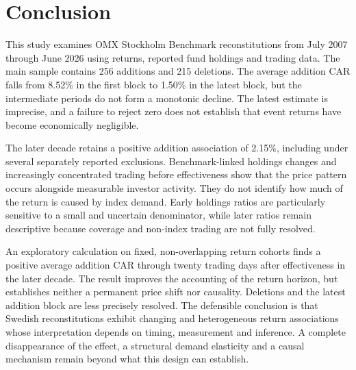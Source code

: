\section{Conclusion}

This study examines OMX Stockholm Benchmark reconstitutions from July 2007 through June 2026 using returns, reported fund holdings and trading data. The main sample contains 256 additions and 215 deletions. The average addition CAR falls from 8.52\% in the first block to 1.50\% in the latest block, but the intermediate periods do not form a monotonic decline. The latest estimate is imprecise, and a failure to reject zero does not establish that event returns have become economically negligible.

The later decade retains a positive addition association of 2.15\%, including under several separately reported exclusions. Benchmark-linked holdings changes and increasingly concentrated trading before effectiveness show that the price pattern occurs alongside measurable investor activity. They do not identify how much of the return is caused by index demand. Early holdings ratios are particularly sensitive to a small and uncertain denominator, while later ratios remain descriptive because coverage and non-index trading are not fully resolved.

An exploratory calculation on fixed, non-overlapping return cohorts finds a positive average addition CAR through twenty trading days after effectiveness in the later decade. The result improves the accounting of the return horizon, but establishes neither a permanent price shift nor causality. Deletions and the latest addition block are less precisely resolved. The defensible conclusion is that Swedish reconstitutions exhibit changing and heterogeneous return associations whose interpretation depends on timing, measurement and inference. A complete disappearance of the effect, a structural demand elasticity and a causal mechanism remain beyond what this design can establish.
